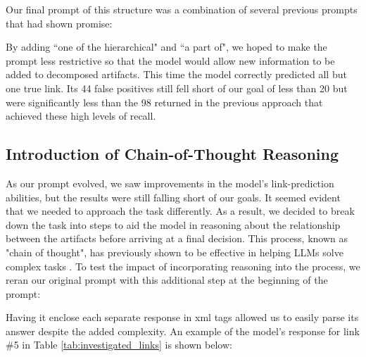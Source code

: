 Our final prompt of this structure was a combination of several previous prompts that had shown promise:


By adding ``one of the hierarchical" and ``a part of", we hoped to make the prompt less restrictive so that the model would allow new information to be added to decomposed artifacts. This time the model correctly predicted all but one true link. Its 44 false positives still fell short of our goal of less than 20 but were significantly less than the 98 returned in the previous approach that achieved these high levels of recall.

\subsection{Introduction of Chain-of-Thought Reasoning}
As our prompt evolved, we saw improvements in the model's link-prediction abilities, but the results were still falling short of our goals. It seemed evident that we needed to approach the task differently. As a result, we decided to break down the task into steps to aid the model in reasoning about the relationship between the artifacts before arriving at a final decision. This process, known as "chain of thought", has previously shown to be effective in helping LLMs solve complex tasks \cite{wei_chain--thought_2023}. To test the impact of incorporating reasoning into the process, we reran our original prompt with this additional step at the beginning of the prompt:


Having it enclose each separate response in xml tags allowed us to easily parse its answer despite the added complexity. An example of the model's response for link \#5 in Table \ref{tab:investigated_links} is shown below:

